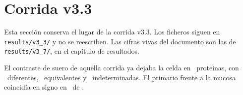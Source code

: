\section{Corrida v3.3}
Esta sección conserva el lugar de la corrida v3.3. Los ficheros siguen en \texttt{results/v3\_3/} y no se reescriben. Las cifras vivas del documento son las de \texttt{results/v3\_7/}, en el capítulo de resultados.

El contraste de suero de aquella corrida ya dejaba la celda en \SueroN\ proteínas, con \SueroDif\ diferentes, \SueroEq\ equivalentes y \SueroInd\ indeterminadas. El primario frente a la mucosa coincidía en signo en \TejidoNum\ de \TejidoDen.

\Advertencia

